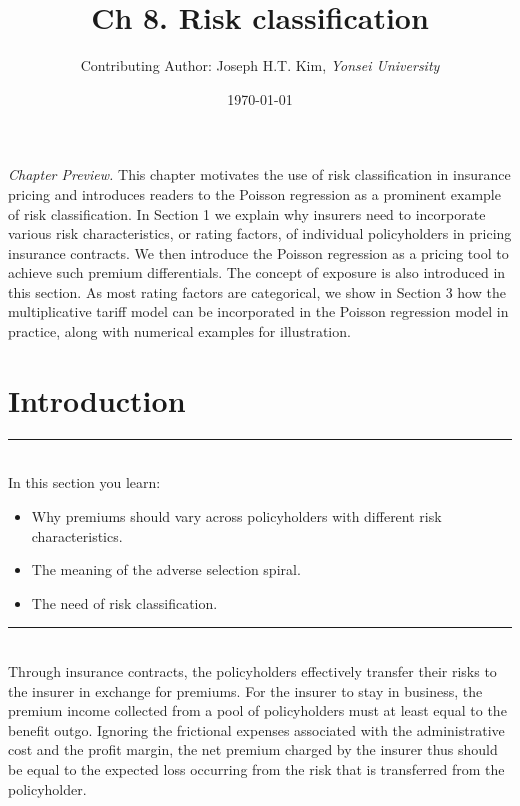 \documentclass[12pt]{article}
\begin{document}

\title{Ch 8. Risk classification}
\author{Contributing Author: Joseph H.T. Kim, \textit{Yonsei University}
}

\date{\today}
\maketitle

\textit{Chapter Preview.} This chapter motivates the use of risk classification in insurance pricing and introduces readers to the Poisson regression as a prominent example of risk classification. In Section 1 we explain why insurers need to incorporate various risk characteristics, or rating factors, of individual policyholders in pricing insurance contracts. We then introduce the Poisson regression as a pricing tool to achieve such premium differentials. The concept of exposure is also introduced in this section. As most rating factors are categorical, we show in Section 3 how the multiplicative tariff model can be incorporated in the Poisson regression model in practice, along with numerical examples for illustration.


\section{Introduction}
\rule{12cm}{0.4pt}\\
In this section you learn: 
\begin{itemize}
  \item Why premiums should vary across policyholders with different risk characteristics.
  \item The meaning of the adverse selection spiral.
  \item The need of risk classification. 
\end{itemize}
\rule{12cm}{0.4pt}\\

Through insurance contracts, the policyholders effectively transfer their risks to the insurer in exchange for premiums. For the insurer to stay in business, the premium income collected from a pool of policyholders must at least equal to the benefit outgo. Ignoring the frictional expenses associated with the administrative cost and the profit margin, the net premium charged by the insurer thus should be equal to the expected loss occurring from the risk that is transferred from the policyholder. \\
\end{document}
